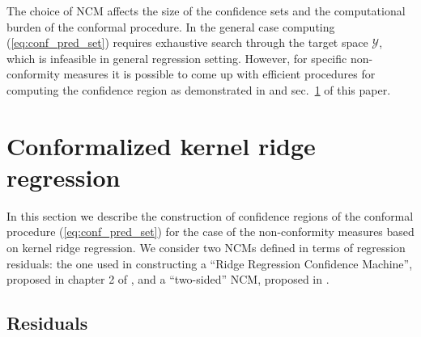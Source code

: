 \documentclass[10pt, conference, compsocconf]{IEEEtran}
\newcommand{\Ycal}{\mathcal{Y}}
\begin{document}
The choice of NCM affects the size of the confidence sets and the computational burden
of the conformal procedure. In the general case computing (\ref{eq:conf_pred_set})
requires exhaustive search through the target space $\Ycal$, which is infeasible in general
regression setting. However, for specific non-conformity measures it is possible to
come up with efficient procedures for computing the confidence region as demonstrated
in \cite{vovk2005} and sec.~\ref{sec:conformalized_krr} of this paper.



\section{Conformalized kernel ridge regression} %
\label{sec:conformalized_krr}

In this section we describe the construction of confidence regions of the conformal
procedure (\ref{eq:conf_pred_set}) for the case of the non-conformity measures
based on kernel ridge regression. We consider two NCMs defined in terms of regression
residuals: the one used in constructing a ``Ridge Regression Confidence Machine'',
proposed in chapter 2 of \cite{vovk2005}, and a ``two-sided'' NCM, proposed in \cite{burnaevV14}.

\subsection{Residuals} %
\label{sub:residuals}
\end{document}
